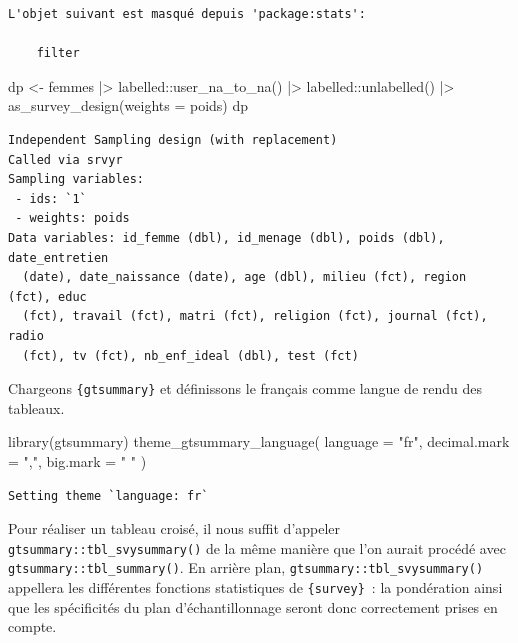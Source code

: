 \documentclass[
  letterpaper,
  DIV=11,
  numbers=noendperiod,
  oneside]{scrreprt}
\newenvironment{Shaded}{\begin{snugshade}}{\end{snugshade}}
\newcommand{\AttributeTok}[1]{\textcolor[rgb]{0.40,0.45,0.13}{#1}}
\newcommand{\FunctionTok}[1]{\textcolor[rgb]{0.28,0.35,0.67}{#1}}
\newcommand{\NormalTok}[1]{\textcolor[rgb]{0.00,0.23,0.31}{#1}}
\newcommand{\OtherTok}[1]{\textcolor[rgb]{0.00,0.23,0.31}{#1}}
\newcommand{\SpecialCharTok}[1]{\textcolor[rgb]{0.37,0.37,0.37}{#1}}
\newcommand{\StringTok}[1]{\textcolor[rgb]{0.13,0.47,0.30}{#1}}
\begin{document}
\begin{verbatim}
L'objet suivant est masqué depuis 'package:stats':

    filter
\end{verbatim}

\begin{Shaded}
\begin{Highlighting}[]
\NormalTok{dp }\OtherTok{\textless{}{-}}\NormalTok{ femmes }\SpecialCharTok{|\textgreater{}} 
\NormalTok{  labelled}\SpecialCharTok{::}\FunctionTok{user\_na\_to\_na}\NormalTok{() }\SpecialCharTok{|\textgreater{}} 
\NormalTok{  labelled}\SpecialCharTok{::}\FunctionTok{unlabelled}\NormalTok{() }\SpecialCharTok{|\textgreater{}} 
  \FunctionTok{as\_survey\_design}\NormalTok{(}\AttributeTok{weights =}\NormalTok{ poids)}
\NormalTok{dp}
\end{Highlighting}
\end{Shaded}

\begin{verbatim}
Independent Sampling design (with replacement)
Called via srvyr
Sampling variables:
 - ids: `1`
 - weights: poids
Data variables: id_femme (dbl), id_menage (dbl), poids (dbl), date_entretien
  (date), date_naissance (date), age (dbl), milieu (fct), region (fct), educ
  (fct), travail (fct), matri (fct), religion (fct), journal (fct), radio
  (fct), tv (fct), nb_enf_ideal (dbl), test (fct)
\end{verbatim}

Chargeons \texttt{\{gtsummary\}} et définissons le français comme langue
de rendu des tableaux.

\begin{Shaded}
\begin{Highlighting}[]
\FunctionTok{library}\NormalTok{(gtsummary)}
\FunctionTok{theme\_gtsummary\_language}\NormalTok{(}
  \AttributeTok{language =} \StringTok{"fr"}\NormalTok{, }
  \AttributeTok{decimal.mark =} \StringTok{","}\NormalTok{, }
  \AttributeTok{big.mark =} \StringTok{" "}
\NormalTok{)}
\end{Highlighting}
\end{Shaded}

\begin{verbatim}
Setting theme `language: fr`
\end{verbatim}

Pour réaliser un tableau croisé, il nous suffit d'appeler
\texttt{gtsummary::tbl\_svysummary()} de la même manière que l'on aurait
procédé avec \texttt{gtsummary::tbl\_summary()}. En arrière plan,
\texttt{gtsummary::tbl\_svysummary()} appellera les différentes
fonctions statistiques de \texttt{\{survey\}}~: la pondération ainsi que
les spécificités du plan d'échantillonnage seront donc correctement
prises en compte.
\end{document}

